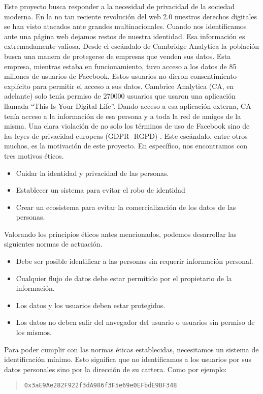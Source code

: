  Este proyecto busca responder a la necesidad de privacidad de la sociedad moderna. En la no tan reciente revolución del web 2.0 nuestros derechos digitales se han visto atacados ante grandes multinacionales. Cuando nos identificamos ante una página web dejamos restos de nuestra identidad. Esa información es extremadamente valiosa. Desde el escándalo de Cambridge Analytica la población busca una manera de protegerse de empresas que venden sus datos. Esta empresa, mientras estaba en funcionamiento, tuvo acceso a los datos de 85 millones de usuarios de Facebook. Estos usuarios no dieron consentimiento explícito para permitir el acceso a sus datos. Cambrice Analytica (CA, en adelante) solo tenía permiso de 270000 usuarios que usaron una aplicación llamada “This Is Your Digital Life”. Dando acceso a esa aplicación externa, CA tenía acceso a la información de esa persona y a toda la red de amigos de la misma. Una clara violación de no solo los términos de uso de Facebook sino de las leyes de privacidad europeas (GDPR-
RGPD) \cite{web:CA} . Este escándalo, entre otros muchos, es la motivación de este proyecto. En específico, nos encontramos con tres motivos éticos.
\begin{itemize}
    \item Cuidar la identidad y privacidad de las personas.
    \item Establecer un sistema para evitar el robo de identidad
    \item Crear un ecosistema para evitar la comercialización de los datos de las personas.
\end{itemize}
 Valorando los principios éticos antes mencionados, podemos desarrollar las siguientes normas de actuación.
\begin{itemize}
    \item Debe ser posible identificar a las personas sin requerir información personal.
    \item Cualquier flujo de datos debe estar permitido por el propietario de la información.
    \item Los datos y los usuarios deben estar protegidos.
    \item Los datos no deben salir del navegador del usuario o usuarios sin permiso de los mismos.
\end{itemize}
Para poder cumplir con las normas éticas establecidas, necesitamos un sistema de identificación mínimo. Esto significa que no identificamos a los usuarios por sus datos personales sino por la dirección de su cartera. Como por ejemplo:
\begin{quote}
    \verb|0x3aE9Ae282F922f3dA986f3F5e69e0EFbdE9BF348|
\end{quote}
